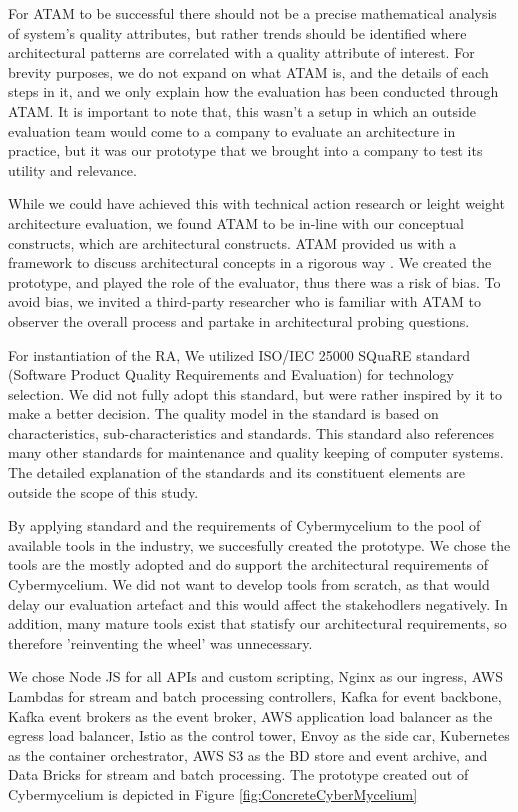 \documentclass{bmcart}
\begin{document}
For ATAM to be successful there should not be a precise mathematical analysis of system's quality attributes, but rather trends should be identified where architectural patterns are correlated with a quality attribute of interest. For brevity purposes, we do not expand on what ATAM is, and the details of each steps in it, and we only explain how the evaluation has been conducted through ATAM. It is important to note that, this wasn't a setup in which an outside evaluation team would come to a company to evaluate an architecture in practice, but it was our prototype that we brought into a company to test its utility and relevance. 

While we could have achieved this with technical action research or leight weight architecture evaluation, we found ATAM to be in-line with our conceptual constructs, which are architectural constructs. ATAM provided us with a framework to discuss architectural concepts in a rigorous way \cite{wieringa2014design}. We created the prototype, and played the role of the evaluator, thus there was a risk of bias. To avoid bias, we invited a third-party researcher who is familiar with ATAM to observer the overall process and partake in architectural probing questions. 

For instantiation of the RA, We utilized ISO/IEC 25000 SQuaRE standard (Software Product Quality Requirements and Evaluation) \cite{ISO25000} for technology selection.  We did not fully adopt this standard, but were rather inspired by it to make a better decision. The quality model in the standard is based on characteristics, sub-characteristics and standards. This standard also references many other standards for maintenance and quality keeping of computer systems. The detailed explanation of the standards and its constituent elements are outside the scope of this study.

By applying standard and the requirements of Cybermycelium to the pool of available tools in the industry, we succesfully created the prototype. We chose the tools are the mostly adopted and do support the architectural requirements of Cybermycelium. We did not want to develop tools from scratch, as that would delay our evaluation artefact and this would affect the stakehodlers negatively. In addition, many mature tools exist that statisfy our architectural requirements, so therefore 'reinventing the wheel' was unnecessary.

We chose Node JS for all APIs and custom scripting, Nginx as our ingress, AWS Lambdas for stream and batch processing controllers, Kafka for event backbone, Kafka event brokers as the event broker, AWS application load balancer as the egress load balancer, Istio as the control tower, Envoy as the side car, Kubernetes as the container orchestrator, AWS S3 as the BD store and event archive, and Data Bricks for stream and batch processing. The prototype created out of Cybermycelium is depicted in Figure \ref{fig:ConcreteCyberMycelium}
\end{document}
